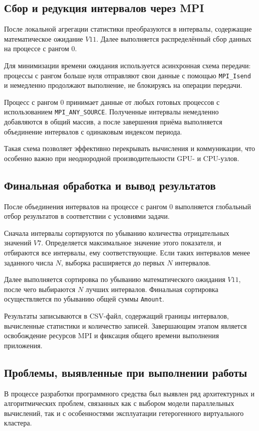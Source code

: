 \documentclass[areaset=advanced]{scrartcl}
\begin{document}
\subsection{Сбор и редукция интервалов через MPI}

После локальной агрегации статистики преобразуются в интервалы, содержащие
математическое ожидание $V11$. Далее выполняется распределённый сбор данных
на процессе с рангом 0.

Для минимизации времени ожидания используется асинхронная схема передачи:
процессы с рангом больше нуля отправляют свои данные с помощью \texttt{MPI\_Isend}
и немедленно продолжают выполнение, не блокируясь на операции передачи.

Процесс с рангом 0 принимает данные от любых готовых процессов с использованием
\texttt{MPI\_ANY\_SOURCE}. Полученные интервалы немедленно добавляются в общий
массив, а после завершения приёма выполняется объединение интервалов с одинаковым
индексом периода.

Такая схема позволяет эффективно перекрывать вычисления и коммуникации,
что особенно важно при неоднородной производительности GPU- и CPU-узлов.

\subsection{Финальная обработка и вывод результатов}

После объединения интервалов на процессе с рангом 0 выполняется глобальный отбор
результатов в соответствии с условиями задачи.

Сначала интервалы сортируются по убыванию количества отрицательных значений $V7$.
Определяется максимальное значение этого показателя, и отбираются все интервалы,
ему соответствующие. Если таких интервалов менее заданного числа $N$, выборка
расширяется до первых $N$ интервалов.

Далее выполняется сортировка по убыванию математического ожидания $V11$, после
чего выбираются $N$ лучших интервалов. Финальная сортировка осуществляется по
убыванию общей суммы \texttt{Amount}.

Результаты записываются в CSV-файл, содержащий границы интервалов, вычисленные
статистики и количество записей. Завершающим этапом является освобождение ресурсов
MPI и фиксация общего времени выполнения приложения.

\subsection{Проблемы, выявленные при выполнении работы}
В процессе разработки программного средства был выявлен ряд архитектурных и
алгоритмических проблем, связанных как с выбором модели параллельных вычислений,
так и с особенностями эксплуатации гетерогенного виртуального кластера.
\end{document}
